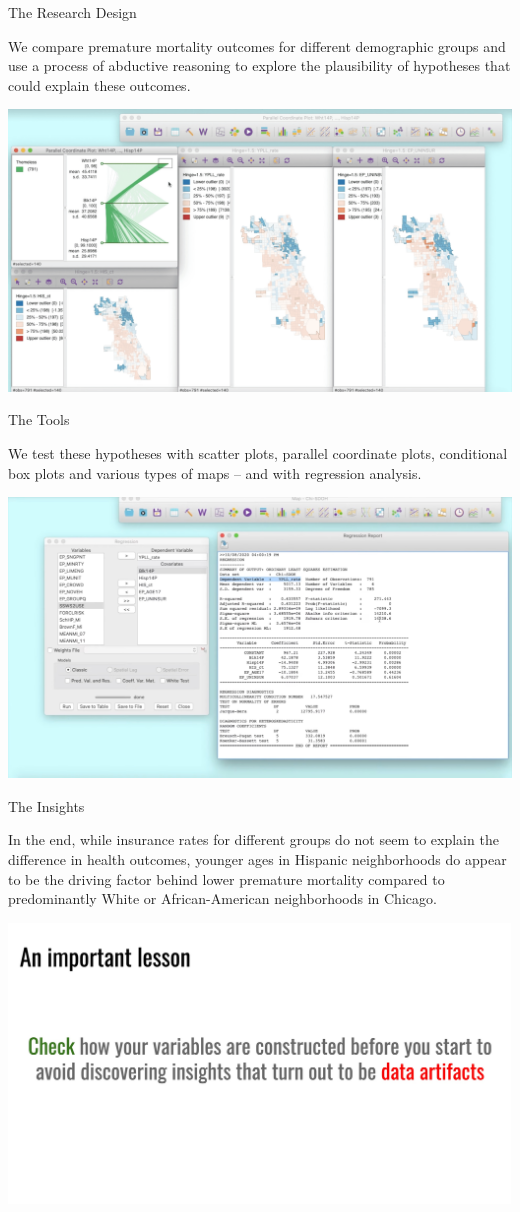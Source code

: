 \documentclass[
]{book}
\begin{document}
The Research Design

We compare premature mortality outcomes for different demographic groups and use a process of abductive reasoning to explore the plausibility of hypotheses that could explain these outcomes.

\includegraphics{images/immigrant3.png}

The Tools

We test these hypotheses with scatter plots, parallel coordinate plots, conditional box plots and various types of maps -- and with regression analysis.

\includegraphics{images/immigrant4.jpg}

The Insights

In the end, while insurance rates for different groups do not seem to explain the difference in health outcomes, younger ages in Hispanic neighborhoods do appear to be the driving factor behind lower premature mortality compared to predominantly White or African-American neighborhoods in Chicago.

\includegraphics{images/immigrant5.jpg}
\end{document}
